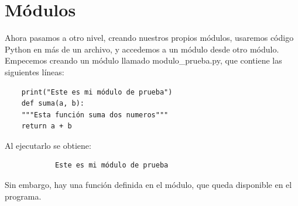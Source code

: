 




\section{Módulos}


Ahora pasamos a otro nivel, creando nuestros propios módulos, usaremos código Python en más de un archivo, y accedemos a un módulo desde otro módulo.\\

Empecemos creando un módulo llamado {\ttfamily modulo\_prueba.py}, que contiene las siguientes líneas:

\hspace{-2.1cm}{\ttfamily \scriptsize modulo\_}

\vspace{-0.2cm}
\hspace{-2.3cm}{\ttfamily \scriptsize prueba.py}\vspace{-0.86cm}
\begin{lstlisting}
	print("Este es mi módulo de prueba")
	def suma(a, b):
	"""Esta función suma dos numeros"""
	return a + b
\end{lstlisting}
Al ejecutarlo se obtiene:

{\ttfamily\scriptsize\scriptsize 
	\hspace{-0.65cm} \vspace{-0.3cm}	
	{\color{blue} 	
		\begin{verbatim}
			Este es mi módulo de prueba		
		\end{verbatim}
}}Sin embargo, hay una función definida en el módulo, que queda disponible en el programa.


